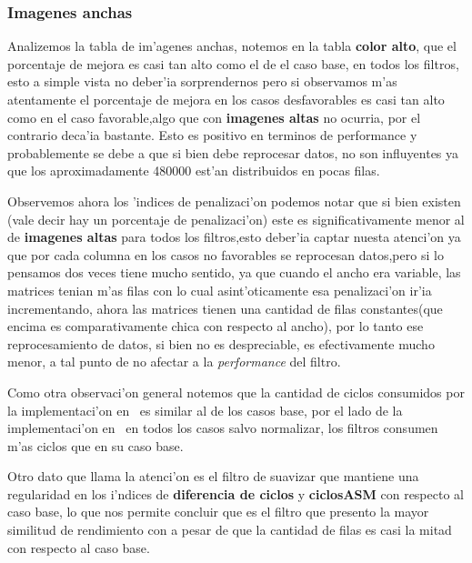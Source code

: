 \subsubsection{Imagenes anchas}
Analizemos la tabla de im'agenes anchas, notemos en la tabla \textbf{color alto}, que el porcentaje de mejora es
casi tan alto como el de el caso base, en todos los filtros, esto a simple vista no deber'ia
 sorprendernos pero si observamos m'as atentamente el porcentaje de mejora en los casos desfavorables es 
casi tan alto como en el caso favorable,algo que con \textbf{imagenes altas} no ocurria, por el contrario
deca'ia bastante. Esto es positivo en terminos de performance y probablemente se debe a que si bien
debe reprocesar datos, no son influyentes ya que los aproximadamente 480000 est'an distribuidos en
pocas filas.

Observemos ahora los 'indices de penalizaci'on podemos notar que si bien existen (vale decir hay un porcentaje
 de penalizaci'on) este es significativamente menor al de \textbf{imagenes altas} para todos los filtros,esto
deber'ia captar nuesta atenci'on ya que por cada columna en los casos no favorables se reprocesan datos,pero
si lo pensamos dos veces tiene mucho sentido, ya que cuando el ancho era variable, las matrices
tenian m'as filas con lo cual asint'oticamente esa penalizaci'on ir'ia incrementando, ahora las matrices
tienen una cantidad de filas constantes(que encima es comparativamente chica con respecto al ancho),
por lo tanto ese reprocesamiento de datos, si bien no es despreciable, es efectivamente mucho menor,
a tal punto de no afectar a la \textit{performance} del filtro.

Como otra observaci'on general notemos que la cantidad de ciclos consumidos por la implementaci'on en \C \ es
similar al de los casos base, por el lado de la implementaci'on en \ass \ en todos los casos salvo normalizar,
los filtros consumen m'as ciclos que en su caso base.

Otro dato que llama la atenci'on es el filtro de suavizar que mantiene una regularidad en los i'ndices de 
\textbf{diferencia de ciclos} y \textbf{ciclosASM} con respecto al caso base, lo que nos permite concluir que es el filtro que
presento la mayor similitud de rendimiento con a pesar de que la cantidad de filas es casi la mitad con respecto al caso
base.



